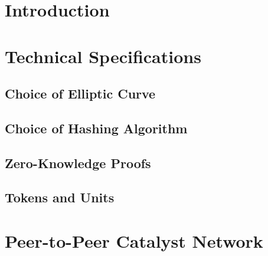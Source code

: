 \documentclass[a4paper, 12pt]{book}
\begin{document}




\chapter*{Introduction} \label{Cha:Int}
 

 
 
\chapter{Technical Specifications} \label{Cha:Tec}



\section{Choice of Elliptic Curve}\label{Sec:EC}



\section{Choice of Hashing Algorithm}\label{Sec:Has}



\section{Zero-Knowledge Proofs}\label{Sec:ZKP}



\section{Tokens and Units}\label{Sec:Tok}






\chapter{Peer-to-Peer Catalyst Network} \label{Cha:NAPI}
\end{document}

